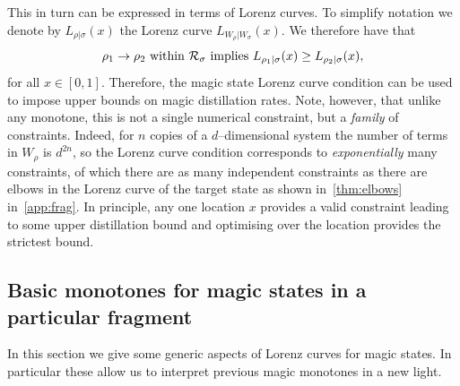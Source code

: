 \documentclass[pra,
aps,
twocolumn,
superscriptaddress,
groupedaddress,
nofootinbib,
reprint
]{revtex4-1}
\begin{document}
This in turn can be expressed in terms of Lorenz curves. To simplify notation we denote by $L_{\rho | \sigma}(x)$ the Lorenz curve $L_{W_{\rho} | W_{\sigma}} (x)$. We therefore have that
\begin{equation}
\rho_1 \rightarrow \rho_2 \mbox{ within }\mathcal{R}_\sigma \mbox{ implies } L_{\rho_1 |\sigma} (x) \ge L_{\rho_2 |\sigma} (x),
\end{equation}
for all $x \in [0,1]$. Therefore, the magic state Lorenz curve condition can be used to impose upper bounds on magic distillation rates. Note, however, that unlike any monotone, this is not a single numerical constraint, but a \emph{family} of constraints. Indeed, for $n$ copies of a $d$--dimensional system the number of terms in $W_{\rho}$ is $d^{2n}$, so the Lorenz curve condition corresponds to \emph{exponentially} many constraints, of which there are as many independent constraints as there are elbows in the Lorenz curve of the target state as shown in~\cref{thm:elbows} in~\cref{app:frag}.
In principle, any one location $x$ provides a valid constraint leading to some upper distillation bound and optimising over the location provides the strictest bound.

\subsection{Basic monotones for magic states in a particular fragment}
\label{sec:lc}

In this section we give some generic aspects of Lorenz curves for magic states. In particular these allow us to interpret previous magic monotones in a new light.
\end{document}
